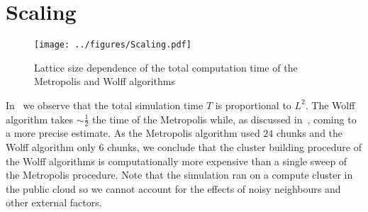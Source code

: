 \section{Scaling}\label{sec:scaling}
	\begin{figure}[htbp]
		\centering
		\texttt{[image: ../figures/Scaling.pdf]}
		\caption[Correlation of the computational effort and the lattice size]{Lattice size dependence of the total computation time of the Metropolis and Wolff algorithms}
		\label{fig:scaling}
	\end{figure}
	In~ we observe that the total simulation time $T$ is proportional to $L^2$. The Wolff algorithm takes $\sim \frac{1}{2}$ the time of the Metropolis while, as discussed in~, coming to a more precise estimate. As the Metropolis algorithm used $24$ chunks and the Wolff algorithm only $6$ chunks, we conclude that the cluster building procedure of the Wolff algorithms is computationally more expensive than a single sweep of the Metropolis procedure. Note that the simulation ran on a compute cluster in the public cloud so we cannot account for the effects of noisy neighbours and other external factors.
